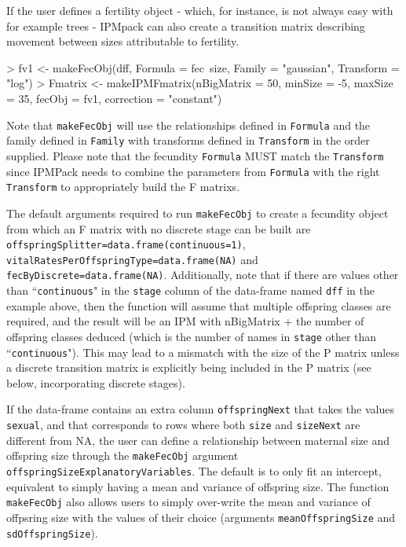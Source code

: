 \documentclass{article}
\begin{document}
If the user defines a fertility object - which, for instance, is not always easy with for example trees - IPMpack can also create a transition matrix describing movement between sizes attributable to fertility.
\begin{Schunk}
\begin{Sinput}
> fv1 <- makeFecObj(dff, Formula = fec~size, 	
                    Family = "gaussian", 
                    Transform = "log")
> Fmatrix <- makeIPMFmatrix(nBigMatrix = 50, minSize = -5,
                              maxSize = 35, 
                              fecObj = fv1, 
                              correction = "constant")
\end{Sinput}
\end{Schunk}
Note that {\tt makeFecObj} will use the relationships defined in {\tt Formula} and the family defined in {\tt Family} with transforms defined in {\tt Transform} in the order supplied. Please note that the fecundity {\tt Formula} MUST match the {\tt Transform} since IPMPack needs to combine the parameters from  {\tt Formula}  with the right  {\tt Transform}  to appropriately build the F matrixs. 

The default arguments required to run {\tt makeFecObj} to create a fecundity
object from which an F matrix with no discrete stage can be built are {\tt
offspringSplitter=data.frame(continuous=1)}, {\tt 
vitalRatesPerOffspringType=data.frame(NA)} and {\tt fecByDiscrete=data.frame(NA)}.
Additionally, note that if there are values other than ``{\tt continuous}" in the {\tt stage} column of the data-frame named {\tt dff} in the example above, then the function will assume that multiple offspring classes are required, and the result will be an IPM with nBigMatrix + the number of offspring classes deduced (which is the number of names in {\tt stage} other than ``{\tt continuous}"). This may lead to a mismatch with the size of the P matrix unless a discrete transition matrix is explicitly being included in the P matrix (see below, incorporating discrete stages).

If the data-frame contains an extra column {\tt offspringNext} that takes the
values {\tt sexual}, and that corresponds to rows where both {\tt size} and {\tt sizeNext} are different from NA, the user can define a relationship between maternal size and offspring size through the {\tt makeFecObj} argument {\tt offspringSizeExplanatoryVariables}. The default is to only fit an intercept, equivalent to simply having a mean and variance of offspring size. The function {\tt makeFecObj} also allows users to simply over-write the mean and variance of offpsring size with the values of their choice (arguments {\tt meanOffspringSize} and {\tt sdOffspringSize}).
\end{document}
